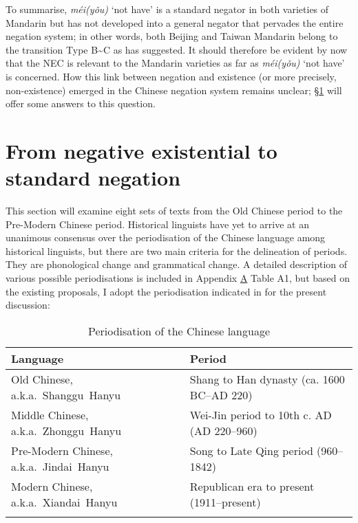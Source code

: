 \documentclass[output=paper]{langscibook}
\begin{document}
To summarise, \textit{méi(yǒu)} `not have' is a standard negator in both varieties of Mandarin but has not developed into a general negator that pervades the entire negation system; in other words, both Beijing and Taiwan Mandarin belong to the transition Type B\sim C as \cite{Croft1991} has suggested. It should therefore be evident by now that the NEC is relevant to the Mandarin varieties as far as \textit{méi(yǒu)} `not have' is concerned. How this link between negation and existence (or more precisely, non-existence) emerged in the Chinese negation system remains unclear; §\ref{s:lam4} will offer some answers to this question.


\section{From negative existential to standard negation}\label{s:lam4}

This section will examine eight sets of texts from the Old Chinese period to the Pre-Modern Chinese period. Historical linguists have yet to arrive at an unanimous consensus over the periodisation of the Chinese language among historical linguists, but there are two main criteria for the delineation of periods. They are phonological change and grammatical change. A detailed description of various possible periodisations is included in Appendix \hyperlink{app:lamA}{A} Table A1, but based on the existing proposals, I adopt the periodisation indicated in  for the present discussion:%

\begin{table}
  \begin{tabularx}{\textwidth}{Ql}
    \lsptoprule
Language & Period\\
    \midrule
Old Chinese,\newline
    \mbox{a.k.a. Shanggu Hanyu} & Shang to Han dynasty (ca. 1600 BC–AD 220)\\
\tablevspace
Middle Chinese,\newline
    \mbox{a.k.a. Zhonggu Hanyu} &  Wei-Jin period to 10th c. AD (AD 220–960)\\
\tablevspace
Pre-Modern Chinese,\newline
    \mbox{a.k.a. Jindai Hanyu} &  Song to Late Qing period (960–1842)\\
\tablevspace
Modern Chinese,\newline
    \mbox{a.k.a. Xiandai Hanyu} & Republican era to present (1911–present)\\
\lspbottomrule
\end{tabularx}
  \caption{Periodisation of the Chinese language}
  \label{ex:lam14}
\end{table}
\end{document}
